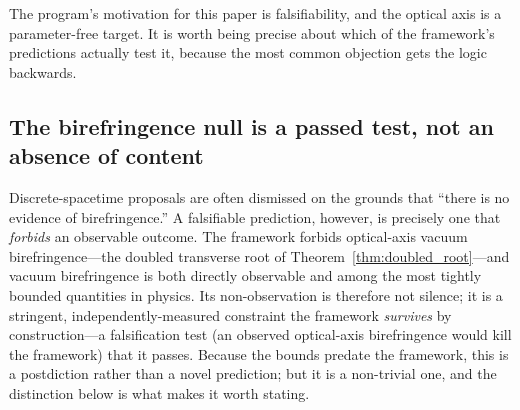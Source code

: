 %
%

\label{sec:falsifiability}

The program's motivation for this paper is falsifiability, and the optical axis is a
parameter-free target. It is worth being precise about which of the framework's
predictions actually test it, because the most common objection gets the logic
backwards.

\subsection{The birefringence null is a passed test, not an absence of content}
\label{subsec:passed_null}

Discrete-spacetime proposals are often dismissed on the grounds that ``there is no
evidence of birefringence.'' A falsifiable prediction, however, is precisely one that
\emph{forbids} an observable outcome. The framework forbids optical-axis vacuum
birefringence---the doubled transverse root of Theorem~\ref{thm:doubled_root}---and
vacuum birefringence is both directly observable and among the most tightly bounded
quantities in physics. Its non-observation is therefore not silence; it is a stringent,
independently-measured constraint the framework \emph{survives} by construction---a
falsification test (an observed optical-axis birefringence would kill the framework) that
it passes. Because the bounds predate the framework, this is a postdiction rather than a
novel prediction; but it is a non-trivial one, and the distinction below is what makes it
worth stating.

